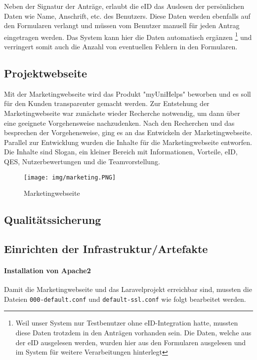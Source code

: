 \documentclass[12pt,a4paper]{scrartcl}
\newcommand{\code}[1]{\texttt{#1}}
\begin{document}
Neben der Signatur der Anträge, erlaubt die eID das Auslesen der persönlichen Daten wie Name, Anschrift, etc. des Benutzers.
Diese Daten werden ebenfalls auf den Formularen verlangt und müssen vom Benutzer manuell für jeden Antrag eingetragen werden.
Das System kann hier die Daten automatisch ergänzen 
 \footnote{Weil unser System nur Testbenutzer ohne eID-Integration hatte, mussten diese Daten trotzdem in den Anträgen vorhanden sein.
Die Daten, welche aus der eID ausgelesen werden, wurden hier aus den Formularen ausgelesen und im System für weitere Verarbeitungen hinterlegt}
und verringert somit auch die Anzahl von eventuellen Fehlern in den Formularen.

\subsection{Projektwebseite}
Mit der Marketingwebseite wird das Produkt "myUniHelps" beworben und es soll für den Kunden transparenter gemacht werden.
Zur Entstehung der Marketingwebseite war zunächste wieder Recherche notwendig, um dann über eine geeignete Vorgehensweise nachzudenken.
Nach den Recherchen und das besprechen der Vorgehensweise, ging es an das Entwickeln der Marketingwebseite.
Parallel zur Entwicklung wurden die Inhalte für die Marketingwebseite entworfen.
Die Inhalte sind Slogan, ein kleiner Bereich mit Informationen, Vorteile, eID, QES, Nutzerbewertungen und die Teamvorstellung.

\begin{figure}[H]
	\centering
	\texttt{[image: img/marketing.PNG]}
	\caption{Marketingwebseite}
	\label{fig:use-case}
\end{figure}

\subsection{Qualitätssicherung}
\label{qualitiyassurance}

\subsection{Einrichten der Infrastruktur/Artefakte}

\paragraph{Installation von Apache2}
Damit die Marketingwebseite und das Laravelprojekt erreichbar sind, mussten die Dateien \code{000-default.conf} und \code{default-ssl.conf} wie folgt bearbeitet werden.
\end{document}
